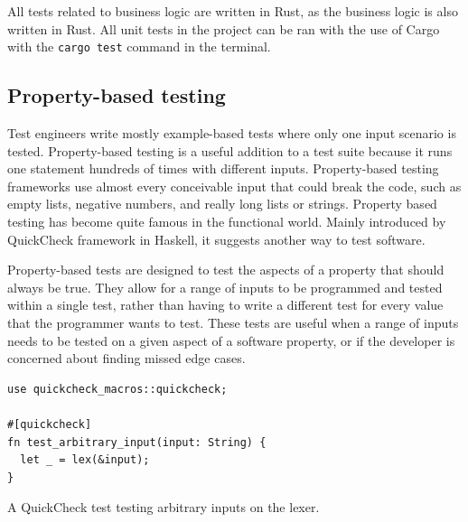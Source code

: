 \documentclass[english,engineering]{wizthesis}
\begin{document}
All tests related to business logic are written in Rust, as the business logic
is also written in Rust. All unit tests in the project can be ran with the use
of Cargo with the \texttt{cargo test} command in the terminal.

\subsection{Property-based testing}

Test engineers write mostly example-based tests where only one input scenario is
tested. Property-based testing is a useful addition to a test suite because it
runs one statement hundreds of times with different inputs. Property-based
testing frameworks use almost every conceivable input that could break the
code, such as empty lists, negative numbers, and really long lists or strings.
Property based testing has become quite famous in the functional world. Mainly
introduced by QuickCheck framework in Haskell, it suggests another way to test
software.

Property-based tests are designed to test the aspects of a property that should
always be true. They allow for a range of inputs to be programmed and tested
within a single test, rather than having to write a different test for every
value that the programmer wants to test. These tests are useful when a range of
inputs needs to be tested on a given aspect of a software property, or if the
developer is concerned about finding missed edge cases.

\begin{listing}[H]
  \begin{verbatim}
use quickcheck_macros::quickcheck;

#[quickcheck]
fn test_arbitrary_input(input: String) {
  let _ = lex(&input);
}
  \end{verbatim}
  \caption{A QuickCheck test testing arbitrary inputs on the lexer.}
  \label{lst:lexer-quickcheck-test}
\end{listing}
\end{document}
